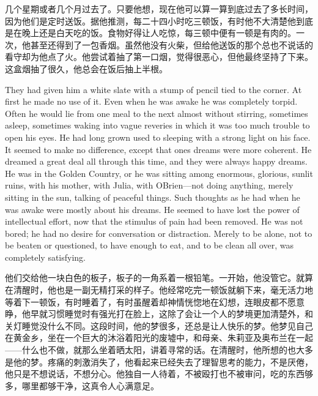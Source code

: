 \begin{paracol}{2}
\switchcolumn

几个星期或者几个月过去了。只要他想，现在他可以算一算到底过去了多长时间，因为他们是定时送饭。据他推测，每二十四小时吃三顿饭，有时他不大清楚他到底是在晚上还是白天吃的饭。食物好得让人吃惊，每三顿中便有一顿是有肉的。一次，他甚至还得到了一包香烟。虽然他没有火柴，但给他送饭的那个总也不说话的看守却为他点了火。他尝试着抽了第一口烟，觉得很恶心，但他最终坚持了下来。这盒烟抽了很久，他总会在饭后抽上半根。

\switchcolumn*

They had given him a white slate with a stump of pencil tied to the
corner. At first he made no use of it. Even when he was awake he was
completely torpid. Often he would lie from one meal to the next almost
without stirring, sometimes asleep, sometimes waking into vague reveries
in which it was too much trouble to open his eyes. He had long grown
used to sleeping with a strong light on his face. It seemed to make no
difference, except that one\textquotesingle s dreams were more coherent.
He dreamed a great deal all through this time, and they were always
happy dreams. He was in the Golden Country, or he was sitting among
enormous, glorious, sunlit ruins, with his mother, with Julia, with
O\textquotesingle Brien---not doing anything, merely sitting in the sun,
talking of peaceful things. Such thoughts as he had when he was awake
were mostly about his dreams. He seemed to have lost the power of
intellectual effort, now that the stimulus of pain had been removed. He
was not bored; he had no desire for conversation or distraction. Merely
to be alone, not to be beaten or questioned, to have enough to eat, and
to be clean all over, was completely satisfying.

\switchcolumn

他们交给他一块白色的板子，板子的一角系着一根铅笔。一开始，他没管它。就算在清醒时，他也是一副无精打采的样子。他经常吃完一顿饭就躺下来，毫无活力地等着下一顿饭，有时睡着了，有时虽醒着却神情恍惚地在幻想，连眼皮都不愿意睁，他早就习惯睡觉时有强光打在脸上，这除了会让一个人的梦境更加清楚外，和关灯睡觉没什么不同。这段时间，他的梦很多，还总是让人快乐的梦。他梦见自己在黄金乡，坐在一个巨大的沐浴着阳光的废墟中，和母亲、朱莉亚及奥布兰在一起——什么也不做，就那么坐着晒太阳，讲着寻常的话。在清醒时，他所想的也大多是他的梦。疼痛的刺激消失了，他看起来已经失去了理智思考的能力，不是厌倦，他只是不想说话，不想分心。他独自一人待着，不被殴打也不被审问，吃的东西够多，哪里都够干净，这真令人心满意足。

\switchcolumn*


\end{paracol}
